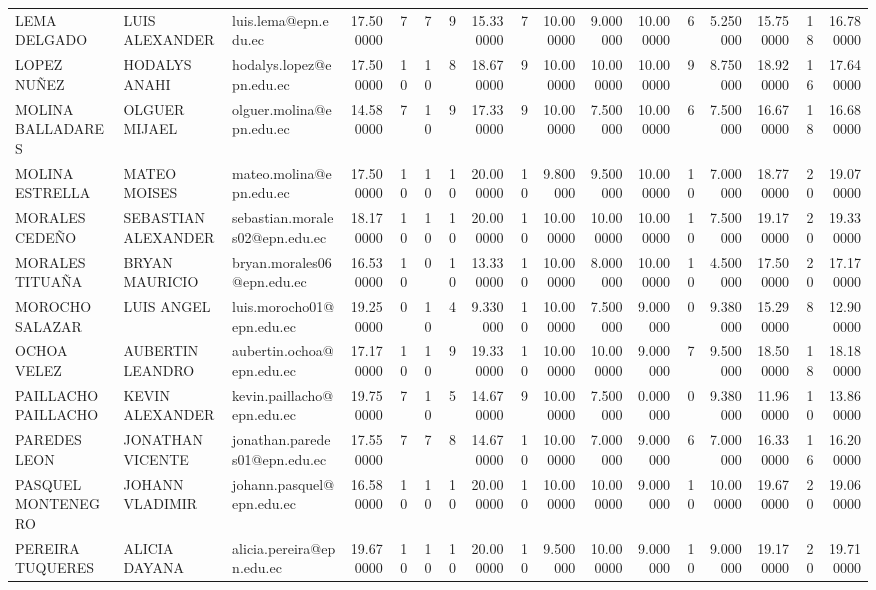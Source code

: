 \begin{tabular}{lllrrrrrrrrrrrrrr}
LEMA DELGADO & LUIS ALEXANDER & luis.lema@epn.edu.ec & 17.500000 & 7 & 7 & 9 & 15.330000 & 7 & 10.000000 & 9.000000 & 10.000000 & 6 & 5.250000 & 15.750000 & 18 & 16.780000 \\
LOPEZ NUÑEZ & HODALYS ANAHI & hodalys.lopez@epn.edu.ec & 17.500000 & 10 & 10 & 8 & 18.670000 & 9 & 10.000000 & 10.000000 & 10.000000 & 9 & 8.750000 & 18.920000 & 16 & 17.640000 \\
MOLINA BALLADARES & OLGUER MIJAEL & olguer.molina@epn.edu.ec & 14.580000 & 7 & 10 & 9 & 17.330000 & 9 & 10.000000 & 7.500000 & 10.000000 & 6 & 7.500000 & 16.670000 & 18 & 16.680000 \\
MOLINA ESTRELLA & MATEO MOISES & mateo.molina@epn.edu.ec & 17.500000 & 10 & 10 & 10 & 20.000000 & 10 & 9.800000 & 9.500000 & 10.000000 & 10 & 7.000000 & 18.770000 & 20 & 19.070000 \\
MORALES CEDEÑO & SEBASTIAN ALEXANDER & sebastian.morales02@epn.edu.ec & 18.170000 & 10 & 10 & 10 & 20.000000 & 10 & 10.000000 & 10.000000 & 10.000000 & 10 & 7.500000 & 19.170000 & 20 & 19.330000 \\
MORALES TITUAÑA & BRYAN MAURICIO & bryan.morales06@epn.edu.ec & 16.530000 & 10 & 0 & 10 & 13.330000 & 10 & 10.000000 & 8.000000 & 10.000000 & 10 & 4.500000 & 17.500000 & 20 & 17.170000 \\
MOROCHO SALAZAR & LUIS ANGEL & luis.morocho01@epn.edu.ec & 19.250000 & 0 & 10 & 4 & 9.330000 & 10 & 10.000000 & 7.500000 & 9.000000 & 0 & 9.380000 & 15.290000 & 8 & 12.900000 \\
OCHOA VELEZ & AUBERTIN LEANDRO & aubertin.ochoa@epn.edu.ec & 17.170000 & 10 & 10 & 9 & 19.330000 & 10 & 10.000000 & 10.000000 & 9.000000 & 7 & 9.500000 & 18.500000 & 18 & 18.180000 \\
PAILLACHO PAILLACHO & KEVIN ALEXANDER & kevin.paillacho@epn.edu.ec & 19.750000 & 7 & 10 & 5 & 14.670000 & 9 & 10.000000 & 7.500000 & 0.000000 & 0 & 9.380000 & 11.960000 & 10 & 13.860000 \\
PAREDES LEON & JONATHAN VICENTE & jonathan.paredes01@epn.edu.ec & 17.550000 & 7 & 7 & 8 & 14.670000 & 10 & 10.000000 & 7.000000 & 9.000000 & 6 & 7.000000 & 16.330000 & 16 & 16.200000 \\
PASQUEL MONTENEGRO & JOHANN VLADIMIR & johann.pasquel@epn.edu.ec & 16.580000 & 10 & 10 & 10 & 20.000000 & 10 & 10.000000 & 10.000000 & 9.000000 & 10 & 10.000000 & 19.670000 & 20 & 19.060000 \\
PEREIRA TUQUERES & ALICIA DAYANA & alicia.pereira@epn.edu.ec & 19.670000 & 10 & 10 & 10 & 20.000000 & 10 & 9.500000 & 10.000000 & 9.000000 & 10 & 9.000000 & 19.170000 & 20 & 19.710000 \\

\end{tabular}
